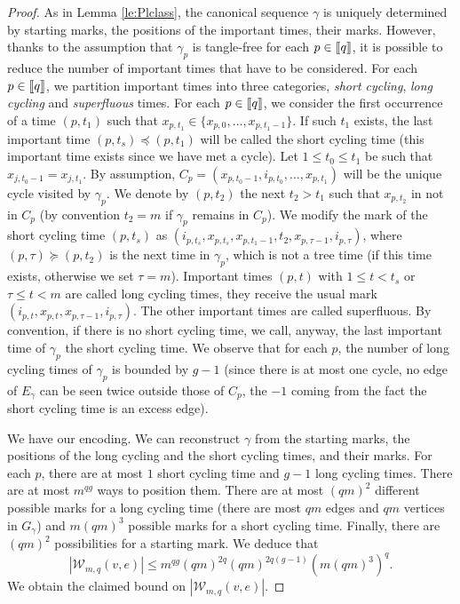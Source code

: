 \documentclass[11pt]{article}
\newcommand{\cW}{\mathcal {W}}
\newcommand{\1}{1\!\!{\sf I}}
\newcommand{\INT}[1]{{{\left[\hspace{-1.4pt}\left[#1\right]\hspace{-1.4pt}\right]}}}
\begin{document}
\begin{proof}
As in Lemma \ref{le:Plclass}, the canonical sequence $\gamma$ is 
uniquely determined by starting marks, the positions of the important times, their marks.  However, thanks to the assumption that $\gamma_p$ is tangle-free for each $p \in \INT{q}$, it is possible to reduce the number of important times that have to be considered. For each $p \in \INT{q}$, we partition important times into three categories, {\em short cycling}, 
{\em long cycling} and {\em superfluous} times. For each $p \in \INT{q}$, we consider the first occurrence of a time $(p,t_1)$ 
such that $x_{p,t_1} \in \{ x_{p,0},  \ldots, x_{p,t_1-1} \}$. If such $t_1$ exists, the last important time $(p,t_s) \preceq (p,t_1)$ 
will be called the short cycling time (this important time exists since we have met a cycle).  Let $1 \leq t_0 \leq t_1$ be such that $x_{j,t_0-1} = x_{j,t_1}$. 
By assumption, $C_p = (x_{p,t_0-1},i_{p,t_0},\ldots, x_{p,t_1})$ will be the unique cycle visited by $\gamma_p$.  
We denote by $(p,t_2)$ the next $t_2 >  t_1$ such that $x_{p,t_2}$ in not in $C_p$ (by convention $t_2 = m$ if 
$\gamma_p$ remains in $C_p$). 
We modify the mark of the short cycling time $(p,t_s)$ as  $(i_{p,t_s},x_{p,t_s}, x_{p,t_1-1}, t_2 ,x_{p, \tau-1},i_{p,\tau})$, where 
$(p,\tau) \succeq (p, t_2)$ is the next time in $\gamma_p$, which is not a tree time (if this time exists, otherwise we set $\tau = m$). 
Important times $(p,t)$ with $1 \leq t < t_s$ or $\tau \leq t < m$ are called long cycling times, they receive the usual mark 
$(i_{p,t},x_{p,t},x_{p,\tau-1},i_{p,\tau})$. The other important times are called superfluous. By convention, if there is no short cycling time, 
we call, anyway, the last important time of $\gamma_p$ the short cycling time. We observe that for each $p$, the number of long cycling times 
of $\gamma_p$ is bounded by  $g-1$ (since there is at most one cycle, no edge of $E_\gamma$ can be seen twice 
outside those of $C_p$, the $-1$ coming from the fact the short cycling time is an excess edge). 


We have our encoding. We can reconstruct $\gamma$ from the starting marks, the positions of the long cycling 
and the short cycling times, and their marks. For each $p$, there are at most $1$ short cycling time and $ g-1$ long cycling 
times. There are at most $  m^{qg}$ ways to position them. There are at most $(qm)^2$ different possible marks for a
long cycling time (there are most $q m$ edges and $qm$ vertices in $G_\gamma$) and $m (qm)^3$ possible marks for a short cycling time. Finally, there are $ (q m) ^2 $ possibilities for a 
starting mark. We deduce that    
$$
| \cW _{m,q} (v,e) | \leq    m^{q g} (  q m )^{2q}   ( q m ) ^{2q (g-1)}(m ( qm)^3 )^{q}. 
$$
We obtain the claimed bound  on $| \cW _{m,q} (v,e) |$. 


\end{proof}
\end{document}
